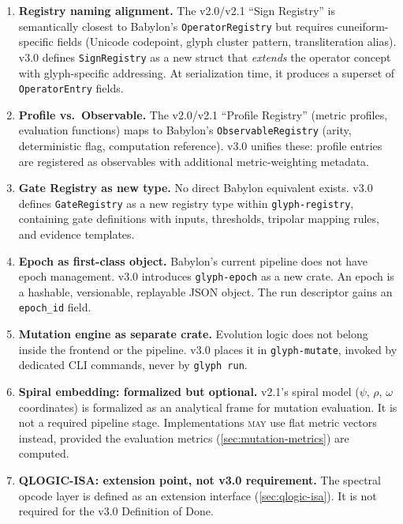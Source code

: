 \documentclass[11pt,a4paper,twoside]{article}
\theoremstyle{definition}
\theoremstyle{remark}
\newcommand{\may}{\textsc{may}}
\begin{document}
\begin{enumerate}[label=\textbf{SD-\arabic*},leftmargin=3cm]
  \item \textbf{Registry naming alignment.} The v2.0/v2.1 ``Sign Registry'' is semantically closest to Babylon's \texttt{OperatorRegistry} but requires cuneiform-specific fields (Unicode codepoint, glyph cluster pattern, transliteration alias). v3.0 defines \texttt{SignRegistry} as a new struct that \emph{extends} the operator concept with glyph-specific addressing. At serialization time, it produces a superset of \texttt{OperatorEntry} fields.

  \item \textbf{Profile vs.\ Observable.} The v2.0/v2.1 ``Profile Registry'' (metric profiles, evaluation functions) maps to Babylon's \texttt{ObservableRegistry} (arity, deterministic flag, computation reference). v3.0 unifies these: profile entries are registered as observables with additional metric-weighting metadata.

  \item \textbf{Gate Registry as new type.} No direct Babylon equivalent exists. v3.0 defines \texttt{GateRegistry} as a new registry type within \texttt{glyph-registry}, containing gate definitions with inputs, thresholds, tripolar mapping rules, and evidence templates.

  \item \textbf{Epoch as first-class object.} Babylon's current pipeline does not have epoch management. v3.0 introduces \texttt{glyph-epoch} as a new crate. An epoch is a hashable, versionable, replayable JSON object. The run descriptor gains an \texttt{epoch\_id} field.

  \item \textbf{Mutation engine as separate crate.} Evolution logic does not belong inside the frontend or the pipeline. v3.0 places it in \texttt{glyph-mutate}, invoked by dedicated CLI commands, never by \texttt{glyph run}.

  \item \textbf{Spiral embedding: formalized but optional.} v2.1's spiral model ($\psi$, $\rho$, $\omega$ coordinates) is formalized as an analytical frame for mutation evaluation. It is not a required pipeline stage. Implementations \may{} use flat metric vectors instead, provided the evaluation metrics (\cref{sec:mutation-metrics}) are computed.

  \item \textbf{QLOGIC-ISA: extension point, not v3.0 requirement.} The spectral opcode layer is defined as an extension interface (\cref{sec:qlogic-isa}). It is not required for the v3.0 Definition of Done.


\end{enumerate}
\end{document}
